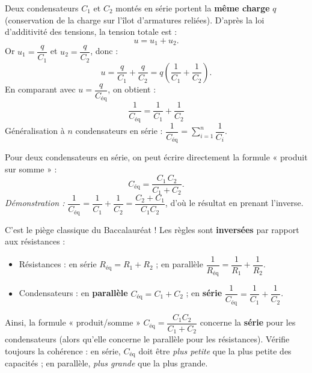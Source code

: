 \documentclass[11pt]{article}
\begin{document}
\begin{propriete}
Deux condensateurs $C_1$ et $C_2$ montés en série portent la \textbf{même charge} $q$ (conservation de la charge sur l'îlot d'armatures reliées). D'après la loi d'additivité des tensions, la tension totale est :
\[ u = u_1 + u_2. \]
Or $u_1 = \dfrac{q}{C_1}$ et $u_2 = \dfrac{q}{C_2}$, donc :
\[ u = \frac{q}{C_1} + \frac{q}{C_2} = q\left(\frac{1}{C_1} + \frac{1}{C_2}\right). \]
En comparant avec $u = \dfrac{q}{C_{\text{éq}}}$, on obtient :
\[ \boxed{\frac{1}{C_{\text{éq}}} = \frac{1}{C_1} + \frac{1}{C_2}} \]
Généralisation à $n$ condensateurs en série : $\dfrac{1}{C_{\text{éq}}} = \displaystyle\sum_{i=1}^{n} \dfrac{1}{C_i}$.
\end{propriete}

\begin{propriete}
Pour deux condensateurs en série, on peut écrire directement la formule « produit sur somme » :
\[ C_{\text{éq}} = \frac{C_1\,C_2}{C_1 + C_2}. \]
\emph{Démonstration :} $\dfrac{1}{C_{\text{éq}}} = \dfrac{1}{C_1} + \dfrac{1}{C_2} = \dfrac{C_2 + C_1}{C_1 C_2}$, d'où le résultat en prenant l'inverse.
\end{propriete}

\begin{attention}
C'est le piège classique du Baccalauréat ! Les règles sont \textbf{inversées} par rapport aux résistances :
\begin{itemize}
\item Résistances : en série $R_{\text{éq}} = R_1 + R_2$ ; en parallèle $\dfrac{1}{R_{\text{éq}}} = \dfrac{1}{R_1} + \dfrac{1}{R_2}$.
\item Condensateurs : en \textbf{parallèle} $C_{\text{éq}} = C_1 + C_2$ ; en \textbf{série} $\dfrac{1}{C_{\text{éq}}} = \dfrac{1}{C_1} + \dfrac{1}{C_2}$.
\end{itemize}
Ainsi, la formule « produit/somme » $C_{\text{éq}} = \dfrac{C_1 C_2}{C_1 + C_2}$ concerne la \textbf{série} pour les condensateurs (alors qu'elle concerne le parallèle pour les résistances). Vérifie toujours la cohérence : en série, $C_{\text{éq}}$ doit être \emph{plus petite} que la plus petite des capacités ; en parallèle, \emph{plus grande} que la plus grande.
\end{attention}
\end{document}
